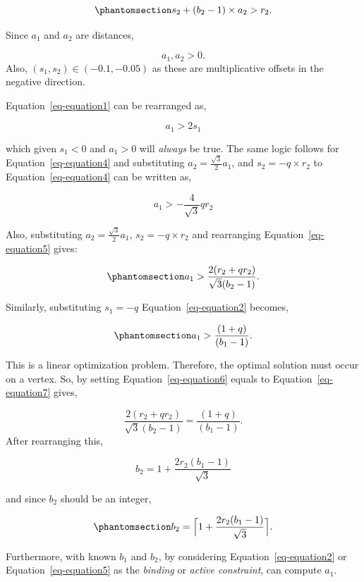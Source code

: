 \documentclass[
  12pt]{article}
\begin{document}
\begin{equation}\phantomsection\label{eq-equation5}{
s_2 + (b_2 - 1) \times a_2 > r_2.
}\end{equation}

Since \(a_1\) and \(a_2\) are distances,

\[
a_1, a_2 > 0.
\] Also, \((s_1, s_2) \in (-0.1, -0.05)\) as these are multiplicative
offsets in the negative direction.

Equation~\ref{eq-equation1} can be rearranged as,

\[
a_1 > 2s_1
\]

which given \(s_1 < 0\) and \(a_1 > 0\) will \emph{always} be true. The
same logic follows for Equation~\ref{eq-equation4} and substituting
\(a_2 = \frac{\sqrt{3}}{2}a_1\), and \(s_2 = -q \times r_2\) to
Equation~\ref{eq-equation4} can be written as,

\[
a_1 > -\frac{4}{\sqrt{3}}qr_2
\]

Also, substituting \(a_2 = \frac{\sqrt{3}}{2}a_1\),
\(s_2 = -q \times r_2\) and rearranging Equation~\ref{eq-equation5}
gives:

\begin{equation}\phantomsection\label{eq-equation6}{
a_1 > \frac{2(r_2 + qr_2)}{\sqrt{3}(b_2 - 1)}.
}\end{equation}

Similarly, substituting \(s_1 = -q\) Equation~\ref{eq-equation2}
becomes,

\begin{equation}\phantomsection\label{eq-equation7}{
a_1 > \frac{(1 + q)}{(b_1 - 1)}.
}\end{equation}

This is a linear optimization problem. Therefore, the optimal solution
must occur on a vertex. So, by setting Equation~\ref{eq-equation6}
equals to Equation~\ref{eq-equation7} gives,

\[
\frac{2(r_2 + qr_2)}{\sqrt{3}(b_2 - 1)} = \frac{(1 + q)}{(b_1 - 1)}.
\] After rearranging this,

\[
b_2 = 1 + \frac{2r_2(b_1 - 1)}{\sqrt{3}}
\]

and since \(b_2\) should be an integer,

\begin{equation}\phantomsection\label{eq-equation8}{
b_2 = \Big\lceil1 +\frac{2r_2(b_1 - 1)}{\sqrt{3}}\Big\rceil.
}\end{equation}

Furthermore, with known \(b_1\) and \(b_2\), by considering
Equation~\ref{eq-equation2} or Equation~\ref{eq-equation5} as the
\emph{binding} or \emph{active constraint}, can compute \(a_1\).
\end{document}
